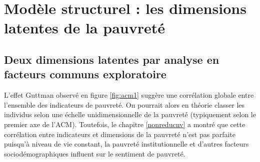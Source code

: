 \documentclass[12pt,a4paper]{reedthesis}
\begin{document}
\hypertarget{sec:esexplostructu}{%
\section{Modèle structurel : les dimensions latentes de la pauvreté}\label{sec:esexplostructu}}

\hypertarget{sec:esexplostructuefa}{%
\subsection{Deux dimensions latentes par analyse en facteurs communs exploratoire}\label{sec:esexplostructuefa}}

L'effet Guttman observé en figure \ref{fig:acm1} suggère une corrélation globale entre l'ensemble des indicateurs de pauvreté. On pourrait alors en théorie classer les individus selon une échelle unidimensionnelle de la pauvreté (typiquement selon le premier axe de l'ACM). Toutefois, le chapitre \ref{nonreducnv} a montré que cette corrélation entre indicateurs et dimensions de la pauvreté n'est pas parfaite puisqu'à niveau de vie constant, la pauvreté institutionnelle et d'autres facteurs sociodémographiques influent sur le sentiment de pauvreté.
\end{document}
